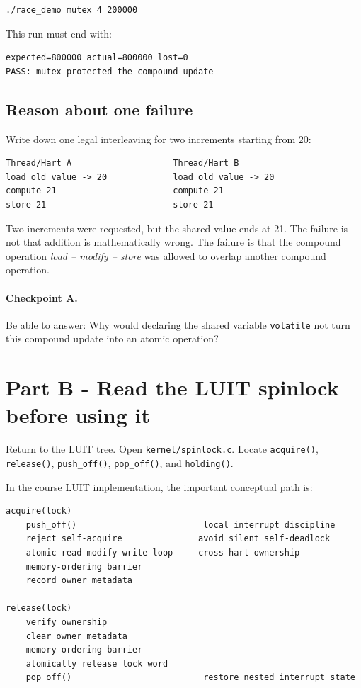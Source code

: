 \documentclass[11pt,a4paper]{article}
\newcommand{\file}[1]{\texttt{#1}}
\begin{document}
\begin{lstlisting}[language=bash]
./race_demo mutex 4 200000
\end{lstlisting}

This run must end with:

\begin{lstlisting}
expected=800000 actual=800000 lost=0
PASS: mutex protected the compound update
\end{lstlisting}

\subsection*{Reason about one failure}

Write down one legal interleaving for two increments starting from 20:

\begin{lstlisting}
Thread/Hart A                    Thread/Hart B
load old value -> 20             load old value -> 20
compute 21                       compute 21
store 21                         store 21
\end{lstlisting}

Two increments were requested, but the shared value ends at 21. The failure is not that addition is mathematically wrong. The failure is that the compound operation \emph{load -- modify -- store} was allowed to overlap another compound operation.

\paragraph{Checkpoint A.} Be able to answer: Why would declaring the shared variable \file{volatile} not turn this compound update into an atomic operation?

\section{Part B - Read the LUIT spinlock before using it}

Return to the LUIT tree. Open \file{kernel/spinlock.c}. Locate \file{acquire()}, \file{release()}, \file{push\_off()}, \file{pop\_off()}, and \file{holding()}.

In the course LUIT implementation, the important conceptual path is:

\begin{lstlisting}
acquire(lock)
    push_off()                         local interrupt discipline
    reject self-acquire               avoid silent self-deadlock
    atomic read-modify-write loop     cross-hart ownership
    memory-ordering barrier
    record owner metadata

release(lock)
    verify ownership
    clear owner metadata
    memory-ordering barrier
    atomically release lock word
    pop_off()                          restore nested interrupt state
\end{lstlisting}
\end{document}

